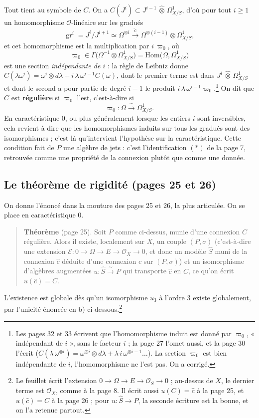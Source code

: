 \documentclass[11pt,a4paper]{article}
\begin{document}
Tout tient au symbole de $C$. On a
$C(J^i) \subset J^{i-1} \,\widehat{\otimes}\, \Omega^1_{X/S}$, d'où pour tout
$i \geqslant 1$ un homomorphisme $\mathcal{O}$-linéaire sur les gradués
\[
  \operatorname{gr}^i = J^i/J^{i+1} \simeq \Omega^{\otimes i}
  \xrightarrow{\ \widetilde{c}\ }
  \Omega^{\otimes(i-1)} \otimes \Omega^1_{X/S},
\]
et cet homomorphisme est la multiplication par $i\,\varpi_0$, où
\[
  \varpi_0 \in \Gamma\big( \Omega^{-1} \otimes \Omega^1_{X/S} \big)
  = \mathrm{Hom}\big( \Omega, \Omega^1_{X/S} \big)
\]
est une section \emph{indépendante de $i$} : la règle de Leibniz donne
$C(\lambda\omega^i) = \omega^i \otimes d\lambda + i\,\lambda\,\omega^{i-1}
C(\omega)$, dont le premier terme est dans $J^i \,\widehat{\otimes}\,
\Omega^1_{X/S}$ et dont le second a pour partie de degré $i-1$ le produit
$i\,\lambda\,\omega^{i-1}\varpi_0$.\footnote{Les pages 32 et 33 écrivent que
l'homomorphisme induit est donné par $\varpi_0$, « indépendant de $i$ », sans
le facteur $i$ ; la page 27 l'omet aussi, et la page 30 l'écrit
($C(\lambda\,\omega^{\otimes i}) = \omega^{\otimes i} \otimes d\lambda +
\lambda\, i\, \omega^{\otimes i-1} \ldots$). La section $\varpi_0$ est bien
indépendante de $i$, l'homomorphisme ne l'est pas. On a corrigé.} On dit que
$C$ est \textbf{régulière} si $\varpi_0$ l'est, c'est-à-dire si
\[
  \varpi_0 : \Omega \xrightarrow{\ \sim\ } \Omega^1_{X/S} .
\]
En caractéristique $0$, ou plus généralement lorsque les entiers $i$ sont
inversibles, cela revient à dire que les homomorphismes induits sur tous les
gradués sont des isomorphismes ; c'est là qu'intervient l'hypothèse sur la
caractéristique.
Cette condition fait de $P$ une algèbre de jets : c'est l'identification $(*)$ de la page 7, retrouvée comme une
propriété de la connexion plutôt que comme une donnée.

\subsection*{Le théorème de rigidité (pages 25 et 26)}

On donne l'énoncé dans la mouture des pages 25 et 26, la plus
articulée. On se place en caractéristique $0$.

\begin{quote}
\textbf{Théorème} (page 25). Soit $P$ comme ci-dessus, munie d'une connexion
$C$ régulière. Alors il existe, localement sur $X$, un couple $(P,\sigma)$
(c'est-à-dire une extension $\mathcal{E} : 0 \to \Omega \to E \to
\mathcal{O}_X \to 0$, et donc un modèle $\widehat{S}$ muni de la connexion
$\widehat{c}$ déduite d'une connexion $c$ sur $(P, \sigma)$) et un
isomorphisme d'algèbres augmentées $u : \widehat{S} \xrightarrow{\ \sim\ }
P$ qui transporte $\widehat{c}$ en $C$, ce qu'on écrit $u(\widehat{c}) = C$.
\end{quote}
L'existence est globale dès qu'un isomorphisme $u_3$ à l'ordre $3$ existe
globalement, par l'unicité énoncée en b) ci-dessous.\footnote{Le feuillet
écrit l'extension $0 \to \Omega \to E \to \mathcal{O}_S \to 0$ ; au-dessus
de $X$, le dernier terme est $\mathcal{O}_X$, comme à la page 8. Il écrit
aussi $u(C) = \widehat{c}$ à la page 25, et $u(\widehat{c}) = C$ à la
page 26 ; pour $u : \widehat{S} \to P$, la seconde écriture est la bonne, et
on l'a retenue partout.}
\end{document}
